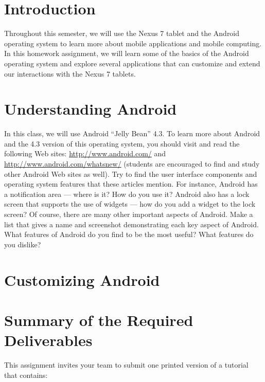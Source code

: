 

\usepackage[compact]{titlesec}



\section*{Introduction}

Throughout this semester, we will use the Nexus 7 tablet and the Android operating system to learn more about mobile
applications and mobile computing.  In this homework assignment, we will learn some of the basics of the Android
operating system and explore several applications that can customize and extend our interactions with the Nexus 7 tablets.

\section*{Understanding Android}

In this class, we will use Android ``Jelly Bean'' 4.3.  To learn more about Android and the 4.3 version of this
operating system, you should visit and read the following Web sites: \url{http://www.android.com/} and
\url{http://www.android.com/whatsnew/} (students are encouraged to find and study other Android Web sites as well). Try
to find the user interface components and operating system features that these articles mention.  For instance, Android
has a notification area --- where is it?  How do you use it? Android also has a lock screen that supports the use of
widgets --- how do you add a widget to the lock screen?  Of course, there are many other important aspects of Android.
Make a list that gives a name and screenshot demonstrating each key aspect of Android.  What features of Android do you
find to be the most useful?  What features do you dislike?


\section*{Customizing Android}


\section*{Summary of the Required Deliverables}

This assignment invites your team to submit one printed version of a tutorial that contains:

